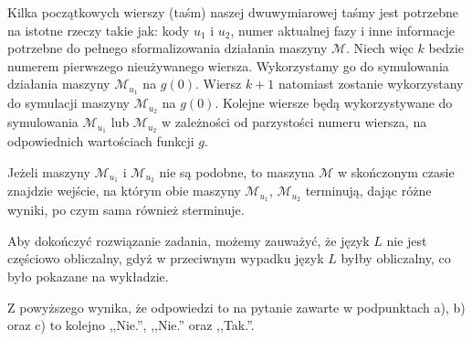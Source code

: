 \documentclass[12pt]{article}
\begin{document}
	\medskip
	
	Kilka początkowych wierszy (taśm) naszej dwuwymiarowej taśmy jest potrzebne
	na istotne rzeczy takie jak: kody \(u_{1}\) i \(u_{2}\), numer aktualnej
	fazy i inne informacje potrzebne do pełnego sformalizowania działania
	maszyny \(\mathcal{M}\). Niech więc \(k\) bedzie numerem pierwszego
	nieużywanego wiersza. Wykorzystamy go do symulowania działania maszyny
	\(\mathcal{M}_{u_{1}}\) na \(g \left( 0 \right)\). Wiersz \(k + 1\)
	natomiast zostanie wykorzystany do symulacji maszyny \(\mathcal{M}_{u_{2}}\)
	na \(g \left( 0 \right)\). Kolejne wiersze będą wykorzystywane do
	symulowania \(\mathcal{M}_{u_{1}}\) lub \(\mathcal{M}_{u_{2}}\) w zależności
	od parzystości numeru wiersza, na odpowiednich wartościach funkcji \(g\).
	
	\medskip
	
	Jeżeli maszyny \(\mathcal{M}_{u_{1}}\) i \(\mathcal{M}_{u_{2}}\) nie są
	podobne, to maszyna \(\mathcal{M}\) w skończonym czasie znajdzie wejście,
	na którym obie maszyny \(\mathcal{M}_{u_{1}}\), \(\mathcal{M}_{u_{2}}\)
	terminują, dając różne wyniki, po czym sama również sterminuje.
	
	\bigskip
	
	Aby dokończyć rozwiązanie zadania, możemy zauważyć, że język \(L\) nie jest
	częściowo obliczalny, gdyż w przeciwnym wypadku język \(L\) byłby
	obliczalny, co było pokazane na wykładzie.
	
	\bigskip
	
	Z powyższego wynika, że odpowiedzi to na pytanie zawarte w podpunktach
	a), b) oraz c) to kolejno ,,Nie.'', ,,Nie.'' oraz ,,Tak.''.
\end{document}
